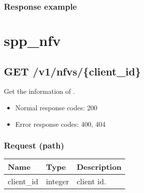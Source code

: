 \documentclass[a4paper,11pt,openany,oneside,english]{sphinxmanual}
\begin{document}
\subsubsection{Response example}
\label{\detokenize{api_ref/spp_primary:id32}}
\begin{sphinxVerbatim}[commandchars=\\\{\},formatcom=\footnotesize]
          
          
\end{sphinxVerbatim}


\section{spp\_nfv}
\label{\detokenize{api_ref/spp_nfv:spp-nfv}}\label{\detokenize{api_ref/spp_nfv:spp-ctl-rest-api-spp-nfv}}\label{\detokenize{api_ref/spp_nfv::doc}}

\subsection{GET /v1/nfvs/\{client\_id\}}
\label{\detokenize{api_ref/spp_nfv:get-v1-nfvs-client-id}}
Get the information of .
\begin{itemize}
\item {} 
Normal response codes: 200

\item {} 
Error response codes: 400, 404

\end{itemize}


\subsubsection{Request (path)}
\label{\detokenize{api_ref/spp_nfv:request-path}}

\begin{savenotes}\sphinxattablestart
\centering
{}
\sphinxthecaptionisattop
{}\label{\detokenize{api_ref/spp_nfv:id23}}\label{\detokenize{api_ref/spp_nfv:table-spp-ctl-nfvs-get}}
\sphinxaftertopcaption
\begin{tabulary}{\linewidth}[t]{|T|T|T|}
\hline
\sphinxstyletheadfamily 
Name
&\sphinxstyletheadfamily 
Type
&\sphinxstyletheadfamily 
Description
\\
\hline
client\_id
&
integer
&
client id.
\\
\hline
\end{tabulary}
\par
\sphinxattableend\end{savenotes}
\end{document}
